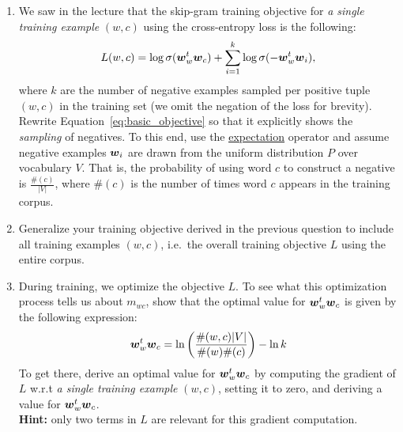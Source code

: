 \documentclass[11pt,a4paper]{article}
\begin{document}
\begin{enumerate}[label=(\alph*)]
    \item We saw in the lecture that the skip-gram training objective for
          \emph{a single training example} $(w,c)$ using the cross-entropy loss
          is the following:
          \begin{align}\label{eq:basic_objective}
              L(w,c) = \log \sigma({\boldsymbol{w}}_w^t{\boldsymbol{w}}_c) + \sum_{i=1}^k \log \sigma(-{\boldsymbol{w}}_w^t{\boldsymbol{w}}_i),
          \end{align}
          where $k$ are the number of negative examples sampled per positive
          tuple $(w,c)$ in the training set (we omit the negation of the loss
          for brevity).
          Rewrite Equation~\ref{eq:basic_objective} so that it explicitly shows
          the \emph{sampling} of negatives.
          To this end, use the
          \href{https://en.wikipedia.org/wiki/Expected_value}{\underline{expectation}}
          operator and assume negative examples ${\boldsymbol{w}}_i$ are drawn from the
          uniform distribution $P$ over vocabulary $V$.
          That is, the probability of using word $c$ to construct a negative is
          $\frac{\#(c)}{|V|}$, where $\#(c)$ is the number of times word $c$
          appears in the training corpus.
    \item Generalize your training objective derived in the previous question to
          include all training examples $(w,c)$, i.e.\ the overall training
          objective $L$ using the entire corpus.
    \item During training, we optimize the objective $L$. To see what this
          optimization process tells us about $m_{wc}$, show that the optimal
          value for ${\boldsymbol{w}}_w^t{\boldsymbol{w}}_c$ is given by the following expression:
          \begin{align}\label{eq:pmi_equality}
              {\boldsymbol{w}}_w^t{\boldsymbol{w}}_c = \ln\left(\frac{\#(w,c) |V|}{\#(w) \#(c)}\right) - \ln k
          \end{align}
          To get there, derive an optimal value for ${\boldsymbol{w}}_w^t{\boldsymbol{w}}_c$ by computing
          the gradient of $L$ w.r.t \emph{a single training example} $(w,c)$,
          setting it to zero, and deriving a value for ${\boldsymbol{w}}_w^t{\boldsymbol{w}}_c$. \\
          \textbf{Hint:} only two terms in $L$ are relevant for this gradient
          computation.
\end{enumerate}
\end{document}
